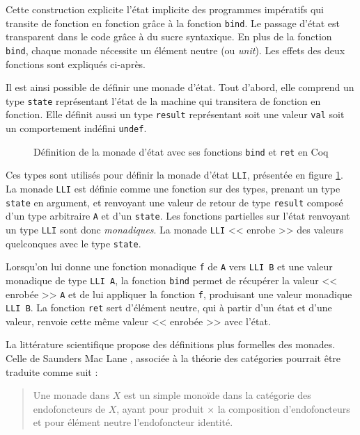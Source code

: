 				Cette construction explicite l'état implicite des programmes impératifs qui transite de fonction en fonction grâce à la fonction \texttt{bind}. Le passage d'état est transparent dans le code grâce à du sucre syntaxique. En plus de la fonction \texttt{bind}, chaque monade nécessite un élément neutre (ou \emph{unit}). Les effets des deux fonctions sont expliqués ci-après.

				Il est ainsi possible de définir une monade d'état. Tout d'abord, elle comprend un type \texttt{state} représentant l'état de la machine qui transitera de fonction en fonction. Elle définit aussi un type \texttt{result} représentant soit une valeur \texttt{val} soit un comportement indéfini \texttt{undef}.

\begin{figure}[!h]
	\caption{Définition de la monade d'état avec ses fonctions \texttt{bind} et \texttt{ret} en Coq}
	\label{code:monad}
\end{figure}

Ces types sont utilisés pour définir la monade d'état \texttt{LLI}, présentée en figure \ref{code:monad}. La monade \texttt{LLI} est définie comme une fonction sur des types, prenant un type \texttt{state} en argument, et renvoyant une valeur de retour de type \texttt{result} composé d'un type arbitraire \texttt{A} et d'un \texttt{state}. Les fonctions partielles sur l'état renvoyant un type \texttt{LLI} sont donc \emph{monadiques}. La monade \texttt{LLI} << enrobe >> des valeurs quelconques avec le type \texttt{state}.

Lorsqu'on lui donne une fonction monadique \texttt{f} de \texttt{A} vers \texttt{LLI B} et une valeur monadique de type \texttt{LLI A}, la fonction \texttt{bind} permet de récupérer la valeur << enrobée >> \texttt{A} et de lui appliquer la fonction \texttt{f}, produisant une valeur monadique \texttt{LLI B}. La fonction \texttt{ret} sert d'élément neutre, qui à partir d'un état et d'une valeur, renvoie cette même valeur << enrobée >> avec l'état.

La littérature scientifique propose des définitions plus formelles des monades. Celle de Saunders Mac Lane \cite[134]{mac2013categories}, associée à la théorie des catégories pourrait être traduite comme suit :

\blockquote{Une monade dans $X$ est un simple monoïde dans la catégorie des endofoncteurs de $X$, ayant pour produit $\times$ la composition d'endofoncteurs et pour élément neutre l'endofoncteur identité.}

